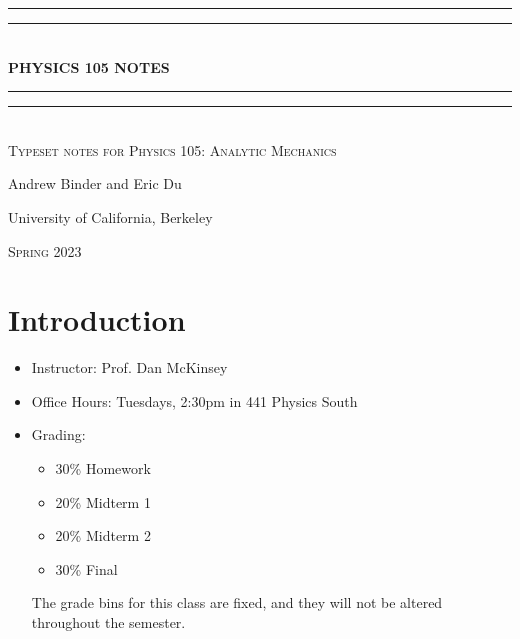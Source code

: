 \documentclass{book}
\begin{document}
    \begin{titlepage}
        \centering
        \vspace*{\baselineskip}\vspace{200pt}
        \rule{\textwidth}{1.6pt}\vspace*{-\baselineskip}\vspace*{2pt}
        \rule{\textwidth}{0.4pt}\\[\baselineskip]
        {\Huge \bfseries \MakeUppercase{Physics 105} NOTES}\\[0.2\baselineskip]
        \rule{\textwidth}{0.4pt}\vspace*{-\baselineskip}\vspace{3.2pt}
        \rule{\textwidth}{1.6pt}\\[\baselineskip]
        \scshape
        Typeset notes for Physics 105: Analytic Mechanics\\
        \par
        \vspace*{2pt}
        {\Large Andrew Binder and Eric Du}\\
        {\large University of California, Berkeley\par}
        {\scshape Spring 2023} \\
    \end{titlepage}
    \setcounter{chapter}{-1}


    \chapter{Introduction}

    \begin{itemize}
        \item Instructor: Prof. Dan McKinsey
        \item Office Hours: Tuesdays, 2:30pm in 441 Physics South
        \item Grading:
        \begin{itemize}
            \item 30\% Homework
            \item 20\% Midterm 1
            \item 20\% Midterm 2
            \item 30\% Final
        \end{itemize}

        The grade bins for this class are fixed, and they will not be altered throughout the semester.
    \end{itemize}

    

     
\end{document}
